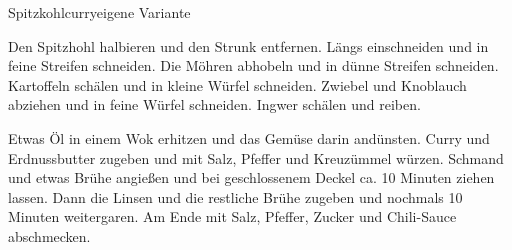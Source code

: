 \begin{recipe}{Spitzkohlcurry}{eigene Variante}
  \label{Spitzkohlcurry}
  \inglist
  
  \steps
  
  Den Spitzhohl halbieren und den Strunk entfernen. Längs einschneiden und in
  feine Streifen schneiden. Die Möhren abhobeln und in dünne Streifen schneiden.
  Kartoffeln schälen und in kleine Würfel schneiden. Zwiebel und Knoblauch
  abziehen und in feine Würfel schneiden. Ingwer schälen und reiben.

  Etwas Öl in einem Wok erhitzen und das Gemüse darin andünsten. Curry und
  Erdnussbutter zugeben und mit Salz, Pfeffer und Kreuzümmel würzen. Schmand und
  etwas Brühe angießen und bei geschlossenem Deckel ca. 10 Minuten ziehen
  lassen. Dann die Linsen und die restliche Brühe zugeben und nochmals 10
  Minuten weitergaren. Am Ende mit Salz, Pfeffer, Zucker und Chili-Sauce abschmecken.
  
\end{recipe}
